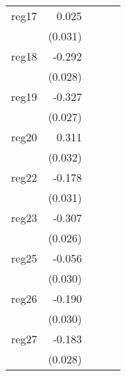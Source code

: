 {\begin{longtable}{l*{4}{D{.}{.}{-1}}}
\addlinespace
reg17       &       0.025         &                     &                     &                     \\
            &     (0.031)         &                     &                     &                     \\
\addlinespace
reg18       &      -0.292\sym{***}&                     &                     &                     \\
            &     (0.028)         &                     &                     &                     \\
\addlinespace
reg19       &      -0.327\sym{***}&                     &                     &                     \\
            &     (0.027)         &                     &                     &                     \\
\addlinespace
reg20       &       0.311\sym{***}&                     &                     &                     \\
            &     (0.032)         &                     &                     &                     \\
\addlinespace
reg22       &      -0.178\sym{***}&                     &                     &                     \\
            &     (0.031)         &                     &                     &                     \\
\addlinespace
reg23       &      -0.307\sym{***}&                     &                     &                     \\
            &     (0.026)         &                     &                     &                     \\
\addlinespace
reg25       &      -0.056         &                     &                     &                     \\
            &     (0.030)         &                     &                     &                     \\
\addlinespace
reg26       &      -0.190\sym{***}&                     &                     &                     \\
            &     (0.030)         &                     &                     &                     \\
\addlinespace
reg27       &      -0.183\sym{***}&                     &                     &                     \\
            &     (0.028)         &                     &                     &                     \\

\end{longtable}}

